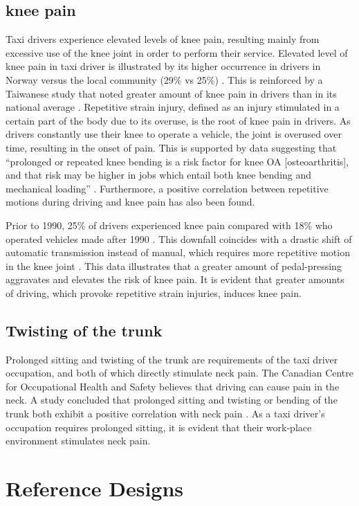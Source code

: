 \documentclass[11pt]{article}
\begin{document}
\subsection{knee pain}
Taxi drivers experience elevated levels of knee pain, resulting mainly
from excessive use of the knee joint in order to perform their
service. Elevated level of knee pain in taxi driver is illustrated by
its higher occurrence in drivers in Norway versus the local community
(29\% vs 25\%) \cite{KneePain}. This is reinforced by a Taiwanese
study that noted greater amount of knee pain in drivers than in its
national average \cite{KneePain}. Repetitive strain injury, defined as
an injury stimulated in a certain part of the body due to its overuse,
is the root of knee pain in drivers\cite{RSI}. As drivers constantly
use their knee to operate a vehicle, the joint is overused over time,
resulting in the onset of pain. This is supported by data suggesting
that “prolonged or repeated knee bending is a risk factor for knee OA
[osteoarthritis], and that risk may be higher in jobs which entail
both knee bending and mechanical loading”
\cite{Osteoarthritis}. Furthermore, a positive correlation between
repetitive motions during driving and knee pain has also been
found. 

Prior to 1990, 25\% of drivers experienced knee pain compared
with 18\% who operated vehicles made after 1990 \cite{KneePain}. This
downfall coincides with a drastic shift of automatic transmission
instead of manual, which requires more repetitive motion in the knee
joint \cite{KneePain}. This data illustrates that a greater amount of
pedal-pressing aggravates and elevates the risk of knee pain. It is
evident that greater amounts of driving, which provoke repetitive
strain injuries, induces knee pain.

\subsection{Twisting of the trunk}
Prolonged sitting and twisting of the trunk are requirements of the
taxi driver occupation, and both of which directly stimulate neck
pain. The Canadian Centre for Occupational Health and Safety believes
that driving can cause pain in the neck\cite{proof}. A study concluded
that prolonged sitting and twisting or bending of the trunk both
exhibit a positive correlation with neck pain \cite{neck}. As a taxi
driver’s occupation requires prolonged sitting, it is evident that
their work-place environment stimulates neck pain.
\section{Reference Designs}
\label{sec:designs}
\end{document}
